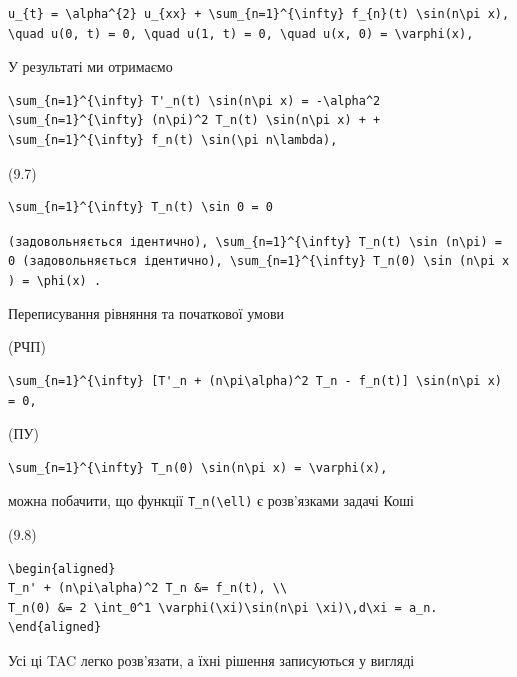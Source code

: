 \documentclass[
  ukrainian,
]{article}
\begin{document}
\begin{verbatim}
u_{t} = \alpha^{2} u_{xx} + \sum_{n=1}^{\infty} f_{n}(t) \sin(n\pi x),
\quad u(0, t) = 0, \quad u(1, t) = 0, \quad u(x, 0) = \varphi(x),
\end{verbatim}

У результаті ми отримаємо

\begin{verbatim}
\sum_{n=1}^{\infty} T'_n(t) \sin(n\pi x) = -\alpha^2 \sum_{n=1}^{\infty} (n\pi)^2 T_n(t) \sin(n\pi x) + + \sum_{n=1}^{\infty} f_n(t) \sin(\pi n\lambda),
\end{verbatim}

(9.7)

\begin{verbatim}
\sum_{n=1}^{\infty} T_n(t) \sin 0 = 0
\end{verbatim}

\texttt{(задовольняється\ ідентично),\ \textquotesingle{}\textbackslash{}sum\_\{n=1\}\^{}\{\textbackslash{}infty\}\ T\_n(t)\ \textbackslash{}sin\ (n\textbackslash{}pi)\ =\ 0\textquotesingle{}\ (задовольняється\ ідентично),\ \textquotesingle{}\textbackslash{}sum\_\{n=1\}\^{}\{\textbackslash{}infty\}\ T\_n(0)\ \textbackslash{}sin\ (n\textbackslash{}pi\ x)\ =\ \textbackslash{}phi(x)\textquotesingle{}\ .}

Переписування рівняння та початкової умови

(РЧП)

\begin{verbatim}
\sum_{n=1}^{\infty} [T'_n + (n\pi\alpha)^2 T_n - f_n(t)] \sin(n\pi x) = 0,
\end{verbatim}

(ПУ)

\begin{verbatim}
\sum_{n=1}^{\infty} T_n(0) \sin(n\pi x) = \varphi(x),
\end{verbatim}

можна побачити, що функції \texttt{T\_n(\textbackslash{}ell)} є
розв'язками задачі Коші

(9.8)

\begin{verbatim}
\begin{aligned}
T_n' + (n\pi\alpha)^2 T_n &= f_n(t), \\
T_n(0) &= 2 \int_0^1 \varphi(\xi)\sin(n\pi \xi)\,d\xi = a_n.
\end{aligned}
\end{verbatim}

Усі ці TAC легко розв'язати, а їхні рішення записуються у вигляді
\end{document}
